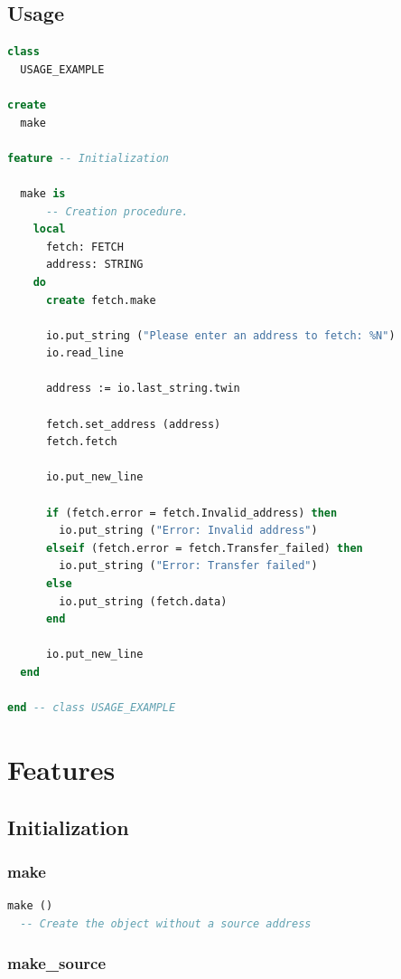 \documentclass[a4paper,fleqn]{report}
\begin{document}
\section{Usage}
\label{sec:usage}

\begin{lstlisting}[language=Eiffel]
class
  USAGE_EXAMPLE

create
  make

feature -- Initialization

  make is
      -- Creation procedure.
    local
      fetch: FETCH
      address: STRING
    do                          
      create fetch.make
                        
      io.put_string ("Please enter an address to fetch: %N")
      io.read_line

      address := io.last_string.twin

      fetch.set_address (address)
      fetch.fetch
                        
      io.put_new_line
                        
      if (fetch.error = fetch.Invalid_address) then
        io.put_string ("Error: Invalid address")
      elseif (fetch.error = fetch.Transfer_failed) then
        io.put_string ("Error: Transfer failed")
      else
        io.put_string (fetch.data)
      end

      io.put_new_line
  end

end -- class USAGE_EXAMPLE
\end{lstlisting}


\chapter{Features}
\label{cha:features}


\section{Initialization}
\label{sec:initialization}


\subsection{make}
\label{sec:make}

\begin{lstlisting}[language=Eiffel]
make ()
  -- Create the object without a source address
\end{lstlisting}


\subsection{make\_source}
\label{sec:make_source}
\end{document}
